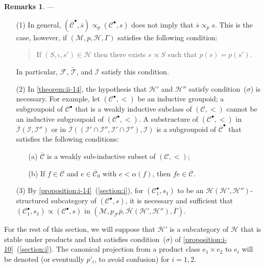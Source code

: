\documentclass[a4paper,fleqn]{article}
\theoremstyle{plain}
\theoremstyle{definition}
\newtheorem*{remarks}{Remarks}
\newcommand{\CC}{\mathcal{C}}
\newcommand{\HH}{\mathcal{H}}
\newcommand{\MM}{\mathcal{M}}
\newcommand{\FF}{\mathcal{F}}
\newcommand{\TT}{\mathcal{T}}
\newcommand{\subs}{\mathrel{\propto}}
\newcommand{\II}{\mathcal{I}}
\newcommand{\smallbullet}{\bullet}
\begin{document}
\begin{remarks}
  ---
  \begin{enumerate}
    \item[\normalfont(1)]
      In general, $(\overline{\CC}^\smallbullet,\overline{s})\subs_{\overline{p}}(\CC^\smallbullet,s)$ does not imply that $\overline{s}\subs_p s$.
      This is the case, however, if $(\MM,p,\HH,\Gamma)$ satisfies the following condition:
      \begin{quote}
        If $(S,\iota,s')\in\HH$ then there exists $s\subs S$ such that $p(s)=p(s')$.
      \end{quote}
      In particular, $\FF$, $\widetilde{\TT}$, and $\II$ satisfy this condition.

    \item[\normalfont(2)]
      In \cref{theorem:ii-14}, the hypothesis that $\HH'$ and $\HH''$ satisfy condition~($\sigma$) is necessary.
      For example, let $(\CC^\smallbullet,<)$ be an inductive groupoid;
      a subgroupoid of $\CC^\smallbullet$ that is a weakly inductive subclass of $(\CC,<)$ cannot be an inductive subgroupoid of $(\CC^\smallbullet,<)$.
      A substructure of $(\CC^\smallbullet,<)$ in $\overline{\II}(\II,\II'')$ or in $\overline{\II}((\II'\cap\II'',\II'\cap\II''),\II)$ is a subgroupoid of $\overline{\CC}^\smallbullet$ that satisfies the following conditions:
      \begin{enumerate}
        \item[\normalfont(a)]
          $\overline{\CC}$ is a weakly sub-inductive subset of $(\CC,<)$;
        \item[\normalfont(b)]
          If $f\in\overline{\CC}$ and $e\in\overline{\CC}_0$ with $e<\alpha(f)$, then $fe\in\overline{\CC}$.
      \end{enumerate}

    \item[\normalfont(3)]
      By \cref{proposition:i-14}~(\cref{section:i}), for $(\CC_1^\smallbullet,s_1)$ to be an $\HH(\HH',\HH'')$-structured subcategory of $(\CC^\smallbullet,s)$, it is necessary and sufficient that $(\CC_1^\smallbullet,s_1)\subs(\CC^\smallbullet,s)$ in $(\MM,p_\FF\overline{p},\overline{\HH}(\HH',\HH''),\overline{\Gamma})$.
  \end{enumerate}
\end{remarks}

For the rest of this section, we will suppose that $\HH'$ is a subcategory of $\HH$ that is stable under products and that satisfies condition~($\sigma$) of \cref{proposition:i-10}~(\cref{section:i}).
The canonical projection from a product class $e_1\times e_2$ to $e_i$ will be denoted (or eventually $p'_i$, to avoid confusion) for $i=1,2$.
\end{document}
